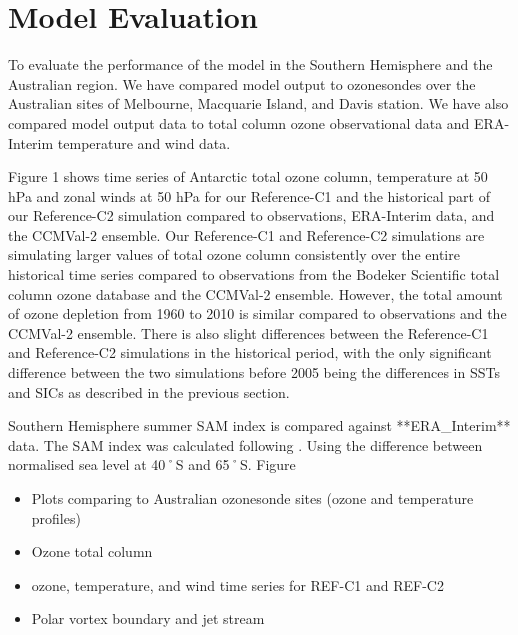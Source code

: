 \section{Model Evaluation}
To evaluate the performance of the model in the Southern Hemisphere and the Australian region. We have compared model output to ozonesondes over the Australian sites of Melbourne, Macquarie Island, and Davis station. We have also compared model output data to total column ozone observational data and ERA-Interim temperature and wind data. 

Figure 1 shows time series of Antarctic total ozone column, temperature at 50 hPa and zonal winds at 50 hPa for our Reference-C1 and the historical part of our Reference-C2 simulation compared to observations, ERA-Interim data, and the CCMVal-2 ensemble. Our Reference-C1 and Reference-C2 simulations are simulating larger values of total ozone column consistently over the entire historical time series compared to observations from the Bodeker Scientific total column ozone database and the CCMVal-2 ensemble. However, the total amount of ozone depletion from 1960 to 2010 is similar compared to observations and the CCMVal-2 ensemble. There is also slight differences between the Reference-C1 and Reference-C2 simulations in the historical period, with the only significant difference between the two simulations before 2005 being the differences in SSTs and SICs as described in the previous section.

Southern Hemisphere summer SAM index is compared against **ERA_Interim** data. The SAM index was calculated following \cite{DaoyiGong:2007vm}. Using the difference between normalised sea level at 40˚S and 65˚S. Figure

\begin{itemize}
\item Plots comparing to Australian ozonesonde sites (ozone and temperature profiles)
\item Ozone total column
\item ozone, temperature, and wind time series for REF-C1 and REF-C2
\item Polar vortex boundary and jet stream
\end{itemize}